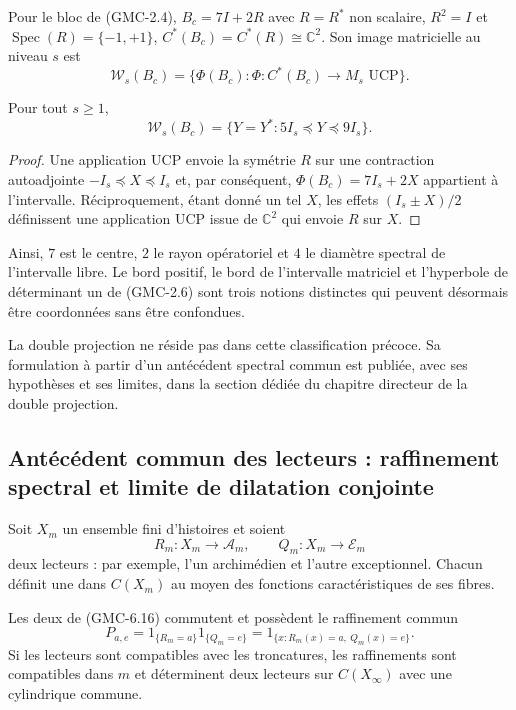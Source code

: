 Pour le bloc de \textup{(GMC-2.4)},
$B_c=7I+2R$ avec $R=R^*$ non scalaire, $R^2=I$ et
$\operatorname{Spec}(R)=\{-1,+1\}$,
$C^*(B_c)=C^*(R)\cong\mathbb C^2$. Son image matricielle au niveau $s$ est
\[
 \mathcal W_s(B_c)=
 \{\Phi(B_c):\Phi:C^*(B_c)\to M_s\text{ UCP}\}.
\]

\begin{theorem}
\label{p12-83-c22-s1:gmc:thm:intervalo-bc}
Pour tout $s\ge1$,
\[
 \boxed{\ 
 \mathcal W_s(B_c)
 =\{Y=Y^*:5I_s\preceq Y\preceq9I_s\}.
 \ }
 \tag{GMC-6.15}
\]
\end{theorem}

\begin{proof}
Une application UCP envoie la symétrie $R$ sur une contraction autoadjointe
$-I_s\preceq X\preceq I_s$ et, par conséquent,
$\Phi(B_c)=7I_s+2X$ appartient à l'intervalle. Réciproquement, étant donné un tel $X$,
les effets $(I_s\pm X)/2$ définissent une application UCP issue de $\mathbb C^2$ qui envoie
$R$ sur $X$.
\end{proof}

Ainsi, $7$ est le centre, $2$ le rayon opératoriel et $4$ le diamètre spectral
de l'intervalle libre. Le bord positif, le bord de l'intervalle matriciel et
l'hyperbole de déterminant un de \textup{(GMC-2.6)} sont trois notions distinctes qui
peuvent désormais être coordonnées sans être confondues.

La double projection ne réside pas dans cette classification précoce. Sa formulation
à partir d'un antécédent spectral commun est publiée, avec ses hypothèses et ses limites,
dans la section dédiée du chapitre directeur de la double projection.
\fi

\ifdefined\HMTGMCDoubleProjection
\subsection{Antécédent commun des lecteurs : raffinement spectral et limite de
dilatation conjointe}

Soit $X_m$ un ensemble fini d'histoires et soient
\[
 R_m:X_m\to\mathcal A_m,
 \qquad
 Q_m:X_m\to\mathcal E_m
 \tag{GMC-6.16}
\]
deux lecteurs : par exemple, l'un archimédien et l'autre exceptionnel. Chacun
définit une \PVM dans $C(X_m)$ au moyen des fonctions caractéristiques de ses
fibres.

\begin{proposition}
\label{p12-83-c22-s1:gmc:prop:doble-proyeccion-conmutativa}
Les deux \PVM de \textup{(GMC-6.16)} commutent et possèdent le raffinement commun
\[
 P_{a,e}=1_{\{R_m=a\}}1_{\{Q_m=e\}}
 =1_{\{x:R_m(x)=a,\ Q_m(x)=e\}}.
 \tag{GMC-6.17}
\]
Si les lecteurs sont compatibles avec les troncatures, les raffinements sont
compatibles dans $m$ et déterminent deux lecteurs sur $C(X_\infty)$ avec une
\PVM cylindrique commune.
\end{proposition}


